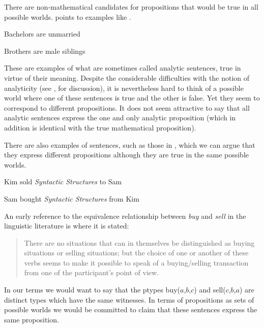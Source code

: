 There are
non-mathematical candidates for propositions that would be true
in all possible worlds.  \cite{King2014} points to examples like
\nexteg{}.
\begin{ex} 
\begin{subex} 
 
\item Bachelors are unmarried
 
\item Brothers are male siblings  
 
\end{subex} 
   
\end{ex} 
These are examples of what are sometimes called analytic sentences,
true in virtue of their meaning.  Despite the considerable
difficulties with the notion of analyticity (see \citealp{Rey2015}, for
discussion), it is nevertheless hard to think of a possible
world where one of these sentences is true and the other is false.
Yet they seem to correspond to different propositions.  It does not
seem attractive to say that all analytic sentences express the one and
only analytic proposition (which in addition is identical with the
true mathematical proposition).

There are also examples of sentences, such as those in \nexteg{}, which we can argue that they
express different propositions although they are true in the same
possible worlds.
\begin{ex} 
\begin{subex} 
 
\item Kim sold \textit{Syntactic Structures} to Sam 
 
\item Sam bought \textit{Syntactic Structures} from Kim 
 
\end{subex} 
 \label{ex:buysell}  
\end{ex} 
An early reference to the equivalence relationship between
\textit{buy} and \textit{sell} in the linguistic literature is
\cite{Fillmore1970} where it is stated:  
\begin{quote}
There are no situations that can in themselves be distinguished as
buying situations or selling situations; but the choice of one or
another of these verbs seems to make it possible to speak of a
buying/selling transaction from one of the participant's point of view.
\end{quote} 
In our terms we would want to say that the ptypes buy($a$,$b$,$c$) and
sell($c$,$b$,$a$) are distinct types which have the same witnesses.
In terms of propositions as sets of possible worlds we would be
committed to claim that these sentences express the same proposition.    


